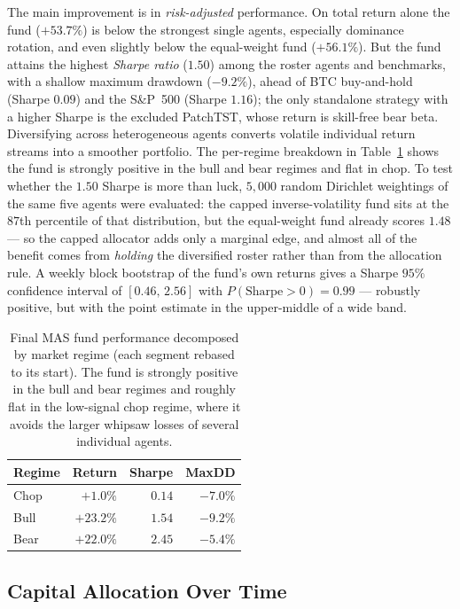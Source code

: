 The main improvement is in \textit{risk-adjusted} performance. On total return alone the fund ($+53.7\%$) is below the strongest single agents, especially dominance rotation, and even slightly below the equal-weight fund ($+56.1\%$). But the fund attains the highest \textit{Sharpe ratio} ($1.50$) among the roster agents and benchmarks, with a shallow maximum drawdown ($-9.2\%$), ahead of BTC buy-and-hold (Sharpe $0.09$) and the S\&P~500 (Sharpe $1.16$); the only standalone strategy with a higher Sharpe is the excluded PatchTST, whose return is skill-free bear beta. Diversifying across heterogeneous agents converts volatile individual return streams into a smoother portfolio. The per-regime breakdown in Table~\ref{tab:fund_regime} shows the fund is strongly positive in the bull and bear regimes and flat in chop. To test whether the $1.50$ Sharpe is more than luck, $5{,}000$ random Dirichlet weightings of the same five agents were evaluated: the capped inverse-volatility fund sits at the $87$th percentile of that distribution, but the equal-weight fund already scores $1.48$ --- so the capped allocator adds only a marginal edge, and almost all of the benefit comes from \textit{holding} the diversified roster rather than from the allocation rule. A weekly block bootstrap of the fund's own returns gives a Sharpe $95\%$ confidence interval of $[0.46,\,2.56]$ with $P(\text{Sharpe}>0)=0.99$ --- robustly positive, but with the point estimate in the upper-middle of a wide band.

\begin{table}[h!]
    \centering
    \caption{Final MAS fund performance decomposed by market regime (each segment rebased to its start). The fund is strongly positive in the bull and bear regimes and roughly flat in the low-signal chop regime, where it avoids the larger whipsaw losses of several individual agents.}
    \label{tab:fund_regime}
    \begin{tabular}{lrrr}
        \toprule
        \textbf{Regime} & \textbf{Return} & \textbf{Sharpe} & \textbf{MaxDD} \\
        \midrule
        Chop  & $+1.0\%$  & $0.14$  & $-7.0\%$ \\
        Bull  & $+23.2\%$ & $1.54$  & $-9.2\%$ \\
        Bear  & $+22.0\%$ & $2.45$  & $-5.4\%$ \\
        \bottomrule
    \end{tabular}
\end{table}

\subsection{Capital Allocation Over Time}

